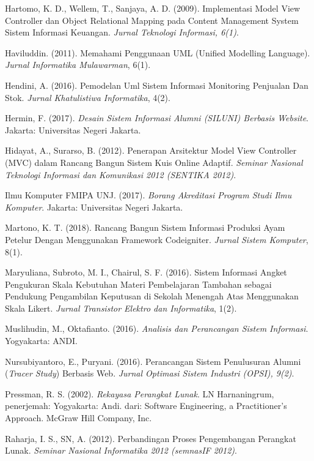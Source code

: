 \documentclass{jtetiskripsi}
\begin{document}
\begin{thebibliography}{99}
 Hartomo, K. D., Wellem, T., Sanjaya, A. D. (2009). Implementasi Model View Controller dan Object Relational Mapping pada Content Management System Sistem Informasi Keuangan. \textit{Jurnal Teknologi Informasi, 6(1)}.

 Haviluddin. (2011). Memahami Penggunaan UML (Unified Modelling Language). \textit{Jurnal Informatika Mulawarman}, 6(1).

 Hendini, A. (2016). Pemodelan Uml Sistem Informasi Monitoring Penjualan Dan Stok. \textit{Jurnal Khatulistiwa Informatika}, 4(2).

 Hermin, F. (2017). \textit{Desain Sistem Informasi Alumni (SILUNI) Berbasis Website}. Jakarta: Universitas Negeri Jakarta.

 Hidayat, A., Surarso, B. (2012). Penerapan Arsitektur Model View Controller (MVC) dalam Rancang Bangun Sistem Kuis Online Adaptif. \textit{Seminar Nasional Teknologi Informasi dan Komunikasi 2012 (SENTIKA 2012)}.

 Ilmu Komputer FMIPA UNJ. (2017).\textit{ Borang Akreditasi Program Studi Ilmu Komputer}. Jakarta: Universitas Negeri Jakarta.

 Martono, K. T. (2018). Rancang Bangun Sistem Informasi Produksi Ayam Petelur Dengan Menggunakan Framework Codeigniter. \textit{Jurnal Sistem Komputer}, 8(1).

 Maryuliana, Subroto, M. I., Chairul, S. F. (2016). Sistem Informasi Angket Pengukuran Skala Kebutuhan Materi Pembelajaran Tambahan sebagai Pendukung Pengambilan Keputusan di Sekolah Menengah Atas Menggunakan Skala Likert. \textit{Jurnal Transistor Elektro dan Informatika}, 1(2).

 Muslihudin, M., Oktafianto. (2016). \textit{Analisis dan Perancangan Sistem Informasi}. Yogyakarta: ANDI.

 Nursubiyantoro, E., Puryani. (2016). Perancangan Sistem Penulusuran Alumni (\textit{Tracer Study}) Berbasis Web. \textit{Jurnal Optimasi Sistem Industri (OPSI), 9(2)}.

 Pressman, R. S. (2002). \textit{Rekayasa Perangkat Lunak}. LN Harnaningrum, penerjemah: Yogyakarta: Andi.  dari: Software Engineering, a Practitioner's Approach. McGraw Hill Company, Inc.

 Raharja, I. S., SN, A. (2012). Perbandingan Proses Pengembangan Perangkat Lunak. \textit{Seminar Nasional Informatika 2012 (semnasIF 2012)}.


\end{thebibliography}
\end{document}

